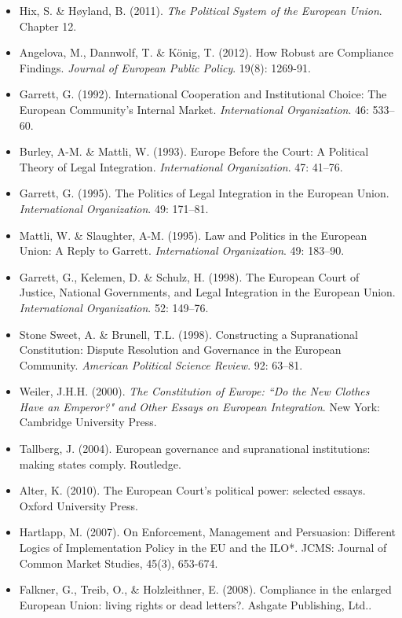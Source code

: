 \begin{itemize}
	\item Hix, S. \& H\o yland, B. (2011). \textit{The Political System of the European Union}. Chapter 12.
	\item Angelova, M., Dannwolf, T. \& K\"{o}nig, T. (2012). How Robust are Compliance Findings. \textit{Journal of European Public Policy}. 19(8): 1269-91.
	\item Garrett, G. (1992). International Cooperation and Institutional Choice: The European Community’s Internal Market. \textit{International Organization}. 46: 533–60.
	\item Burley, A-M. \& Mattli, W. (1993). Europe Before the Court: A Political Theory of Legal Integration. \textit{International Organization}. 47: 41–76.
	\item Garrett, G. (1995). The Politics of Legal Integration in the European Union. \textit{International Organization}. 49: 171–81.
	\item Mattli, W. \& Slaughter, A-M. (1995). Law and Politics in the European Union: A Reply to Garrett. \textit{International Organization}. 49: 183–90.
	\item Garrett, G., Kelemen, D. \& Schulz, H. (1998). The European Court of Justice, National Governments, and Legal Integration in the European Union. \textit{International Organization}. 52: 149–76.
	\item Stone Sweet, A. \& Brunell, T.L. (1998). Constructing a Supranational Constitution: Dispute Resolution and Governance in the European Community. \textit{American Political Science Review}. 92: 63–81.
	\item Weiler, J.H.H. (2000). \textit{The Constitution of Europe: ``Do the New Clothes Have an Emperor?" and Other Essays on European Integration}. New York: Cambridge University Press.
	\item Tallberg, J. (2004). European governance and supranational institutions: making states comply. Routledge.
	\item Alter, K. (2010). The European Court's political power: selected essays. Oxford University Press.
	\item Hartlapp, M. (2007). On Enforcement, Management and Persuasion: Different Logics of Implementation Policy in the EU and the ILO*. JCMS: Journal of Common Market Studies, 45(3), 653-674.
	\item Falkner, G., Treib, O., \& Holzleithner, E. (2008). Compliance in the enlarged European Union: living rights or dead letters?. Ashgate Publishing, Ltd..

\end{itemize}
